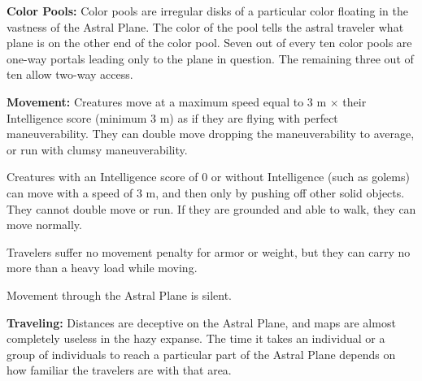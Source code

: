 \textbf{Color Pools:} Color pools are irregular disks of a particular color floating in the vastness of the Astral Plane. The color of the pool tells the astral traveler what plane is on the other end of the color pool. Seven out of every ten color pools are one-way portals leading only to the plane in question. The remaining three out of ten allow two-way access.


\textbf{Movement:} Creatures move at a maximum speed equal to 3 m $\times$ their Intelligence score (minimum 3 m) as if they are flying with perfect maneuverability. They can double move dropping the maneuverability to average, or run with clumsy maneuverability.

Creatures with an Intelligence score of 0 or without Intelligence (such as golems) can move with a speed of 3 m, and then only by pushing off other solid objects. They cannot double move or run. If they are grounded and able to walk, they can move normally.

Travelers suffer no movement penalty for armor or weight, but they can carry no more than a heavy load while moving.

Movement through the Astral Plane is silent.

\textbf{Traveling:} Distances are deceptive on the Astral Plane, and maps are almost completely useless in the hazy expanse. The time it takes an individual or a group of individuals to reach a particular part of the Astral Plane depends on how familiar the travelers are with that area.

